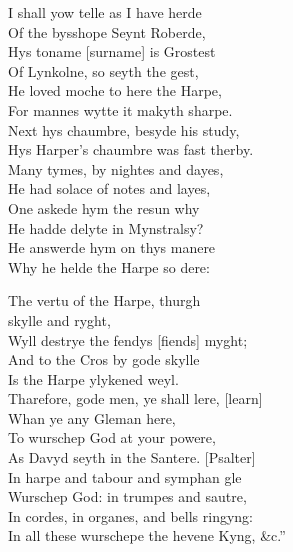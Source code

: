 \settowidth{\versewidth}{Hys Harper’s chaumbre was fast ther}

\begin{dcverse} I shall yow telle as I have herde\\
Of the bysshope Seynt Roberde,\\
Hys toname [surname] is Grostest\\
Of Lynkolne, so seyth the gest,\\
He loved moche to here the Harpe,\\
For mannes wytte it makyth sharpe.\\
Next hys chaumbre, besyde his study,\\
Hys Harper’s chaumbre was fast therby.\\
Many tymes, by nightes and dayes,\\
He had solace of notes and layes,\\
One askede hym the resun why\\
He hadde delyte in Mynstralsy?\\
He answerde hym on thys manere\\
Why he helde the Harpe so dere:\\
\columnbreak

The vertu of the Harpe, thurgh\\
\vin\vin\vin [through] skylle and ryght,\\
Wyll destrye the fendys [fiends] myght;\\
And to the Cros by gode skylle\\
Is the Harpe ylykened weyl.\\
Tharefore, gode men, ye shall lere, [learn]\\
Whan ye any Gleman here,\\
To wurschep God at your powere,\\
As Davyd seyth in the Santere. [Psalter]\\
In harpe and tabour and symphan %
gle\\
Wurschep God: in trumpes and sautre,\\
In cordes, in organes, and bells ringyng:\\
In all these wurschepe the hevene Kyng, \&c.”
\end{dcverse}\normalsize


